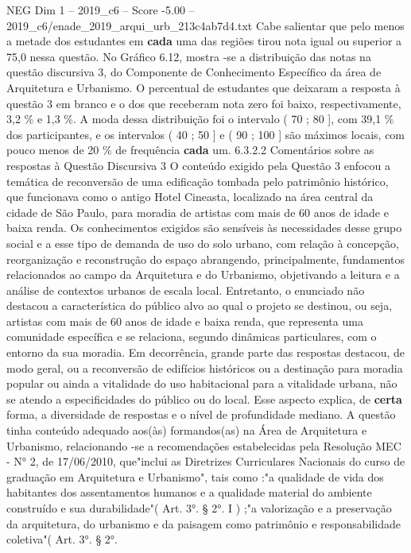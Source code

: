 \begin{textsample}{NEG Dim 1 – 2019\_c6 – Score -5.00 – 2019\_c6/enade\_2019\_arqui\_urb\_213c4ab7d4.txt}
Cabe salientar que pelo menos a metade dos estudantes em \textbf{cada} uma das regiões tirou nota igual ou superior a 75,0 nessa questão.
No Gráfico 6.12, mostra -se a distribuição das notas na questão discursiva 3, do Componente de Conhecimento Específico da área de Arquitetura e Urbanismo.
O percentual de estudantes que deixaram a resposta à questão 3 em branco e o dos que receberam nota zero foi baixo, respectivamente, 3,2 \% e 1,3 \%.
A moda dessa distribuição foi o intervalo ( 70 ; 80 ], com 39,1 \% dos participantes, e os intervalos ( 40 ; 50 ] e ( 90 ; 100 ] são máximos locais, com pouco menos de 20 \% de frequência \textbf{cada} um. 6.3.2.2 Comentários sobre as respostas à Questão Discursiva 3 O conteúdo exigido pela Questão 3 enfocou a temática de reconversão de uma edificação tombada pelo patrimônio histórico, que funcionava como o antigo Hotel Cineasta, localizado na área central da cidade de São Paulo, para moradia de artistas com mais de 60 anos de idade e baixa renda.
Os conhecimentos exigidos são sensíveis às necessidades desse grupo social e a esse tipo de demanda de uso do solo urbano, com relação à concepção, reorganização e reconstrução do espaço abrangendo, principalmente, fundamentos relacionados ao campo da Arquitetura e do Urbanismo, objetivando a leitura e a análise de contextos urbanos de escala local.
Entretanto, o enunciado não destacou a característica do público alvo ao qual o projeto se destinou, ou seja, artistas com mais de 60 anos de idade e baixa renda, que representa uma comunidade específica e se relaciona, segundo dinâmicas particulares, com o entorno da sua moradia.
Em decorrência, grande parte das respostas destacou, de modo geral, ou a reconversão de edifícios históricos ou a destinação para moradia popular ou ainda a vitalidade do uso habitacional para a vitalidade urbana, não se atendo a especificidades do público ou do local.
Esse aspecto explica, de \textbf{certa} forma, a diversidade de respostas e o nível de profundidade mediano.
A questão tinha conteúdo adequado aos(às) formandos(as) na Área de Arquitetura e Urbanismo, relacionando -se a recomendações estabelecidas pela Resolução MEC - N{\EmojiFont °} 2, de 17/06/2010, que"inclui as Diretrizes Curriculares Nacionais do curso de graduação em Arquitetura e Urbanismo", tais como :"a qualidade de vida dos habitantes dos assentamentos humanos e a qualidade material do ambiente construído e sua durabilidade"( Art. 3{\EmojiFont °}. § 2{\EmojiFont °}.
I ) ;"a valorização e a preservação da arquitetura, do urbanismo e da paisagem como patrimônio e responsabilidade coletiva"( Art. 3{\EmojiFont °}. § 2{\EmojiFont °}.

\end{textsample}
